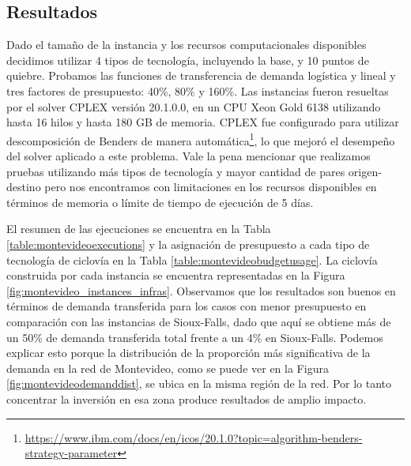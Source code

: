 \subsection{Resultados}

Dado el tamaño de la instancia y los recursos computacionales disponibles decidimos utilizar 4 tipos de tecnología, incluyendo la base, y 10 puntos de quiebre. Probamos las funciones de transferencia de demanda logística y lineal y tres factores de presupuesto: 40\%, 80\% y 160\%. Las instancias fueron resueltas por el solver CPLEX versión 20.1.0.0, en un CPU Xeon Gold 6138 utilizando hasta 16 hilos y hasta 180 GB de memoria. CPLEX fue configurado para utilizar descomposición de Benders de manera automática\footnote{\url{https://www.ibm.com/docs/en/icos/20.1.0?topic=algorithm-benders-strategy-parameter}}, lo que mejoró el desempeño del solver aplicado a este problema. Vale la pena mencionar que realizamos pruebas utilizando más tipos de tecnología y mayor cantidad de pares origen-destino pero nos encontramos con limitaciones en los recursos disponibles en términos de memoria o límite de tiempo de ejecución de 5 días.

El resumen de las ejecuciones se encuentra en la Tabla \ref{table:montevideoexecutions} y la asignación de presupuesto a cada tipo de tecnología de ciclovía en la Tabla \ref{table:montevideobudgetusage}. La ciclovía construida por cada instancia se encuentra representadas en la Figura \ref{fig:montevideo_instances_infras}. Observamos que los resultados son buenos en términos de demanda transferida para los casos con menor presupuesto en comparación con las instancias de Sioux-Falls, dado que aquí se obtiene más de un 50\% de demanda transferida total frente a un 4\% en Sioux-Falls. Podemos explicar esto porque la distribución de la proporción más significativa de la demanda en la red de Montevideo, como se puede ver en la Figura \ref{fig:montevideodemanddist}, se ubica en la misma región de la red. Por lo tanto concentrar la inversión en esa zona produce resultados de amplio impacto.


